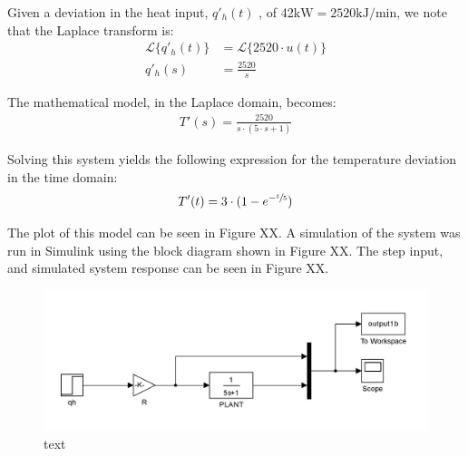\documentclass{article}
\begin{document}
Given a deviation in the heat input, $q'_h(t)$ , of 42$\si{\kilo\watt} = 2520\si{\kilo\joule\per\minute}$, we note that the Laplace transform is:
\begin{align*}
\mathscr{L}\{q'_h(t)\} &= \mathscr{L}\{2520 \cdot u(t)\}\\
q'_h(s) &= \frac{2520}{s}
\end{align*}

The mathematical model, in the Laplace domain, becomes:
\begin{align}
T'(s) = \frac{2520}{s \cdot (5 \cdot s + 1)}
\end{align}

Solving this system yields the following expression for the temperature deviation in the time domain:
\begin{align}
T'(t) = 3 \cdot (1 - e^{-\sfrac{t}{5}})
\end{align}

The plot of this model can be seen in Figure XX. A simulation of the system was run in Simulink using the block diagram shown in Figure XX. The step input, and simulated system response can be seen in Figure XX.

\begin{figure}[h]
\centering
\includegraphics[scale=0.2]{block_1b}
\caption{text}
\end{figure}
\end{document}
